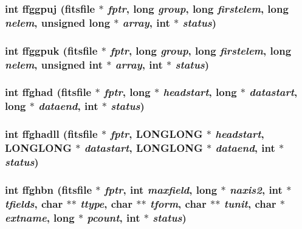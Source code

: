 \subsubsection{\setlength{\rightskip}{0pt plus 5cm}int ffggpuj (\bf{fitsfile} $\ast$ {\em fptr}, long {\em group}, long {\em firstelem}, long {\em nelem}, unsigned long $\ast$ {\em array}, int $\ast$ {\em status})}\label{src_2fitsio_8h_895a8758518346c4e79ba31731f2a726}


\subsubsection{\setlength{\rightskip}{0pt plus 5cm}int ffggpuk (\bf{fitsfile} $\ast$ {\em fptr}, long {\em group}, long {\em firstelem}, long {\em nelem}, unsigned int $\ast$ {\em array}, int $\ast$ {\em status})}\label{src_2fitsio_8h_2903d7086c8c109b98b9626067b45c11}


\subsubsection{\setlength{\rightskip}{0pt plus 5cm}int ffghad (\bf{fitsfile} $\ast$ {\em fptr}, long $\ast$ {\em headstart}, long $\ast$ {\em datastart}, long $\ast$ {\em dataend}, int $\ast$ {\em status})}\label{src_2fitsio_8h_e1b924d5db7f75a39e445055e1bb12cc}


\subsubsection{\setlength{\rightskip}{0pt plus 5cm}int ffghadll (\bf{fitsfile} $\ast$ {\em fptr}, \bf{LONGLONG} $\ast$ {\em headstart}, \bf{LONGLONG} $\ast$ {\em datastart}, \bf{LONGLONG} $\ast$ {\em dataend}, int $\ast$ {\em status})}\label{src_2fitsio_8h_d9af6a189f3d9ea5cab7da778ed4cdd2}


\subsubsection{\setlength{\rightskip}{0pt plus 5cm}int ffghbn (\bf{fitsfile} $\ast$ {\em fptr}, int {\em maxfield}, long $\ast$ {\em naxis2}, int $\ast$ {\em tfields}, char $\ast$$\ast$ {\em ttype}, char $\ast$$\ast$ {\em tform}, char $\ast$$\ast$ {\em tunit}, char $\ast$ {\em extname}, long $\ast$ {\em pcount}, int $\ast$ {\em status})}\label{src_2fitsio_8h_bc0f689fe3484d2f9c8a9703b058b342}


